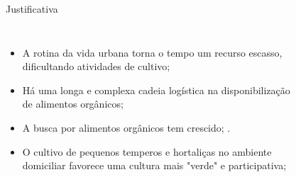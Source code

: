 \begin{frame}[t]{Justificativa} 
    \transdissolve[duration=0.5]
        \begin{columns}[t]
                \begin{itemize}
                    \justifying
                    \item A rotina da vida urbana torna o tempo um recurso escasso, dificultando atividades de cultivo; \cite{G1:3xtransito}
                    \item Há uma longa e complexa cadeia logística na disponibilização de alimentos orgânicos; \cite{silva:cadeiaprodutiva}
                    \item A busca por alimentos orgânicos tem crescido;  \cite{sebrae:organicos}.
                    \item O cultivo de pequenos temperos e hortaliças no ambiente domiciliar favorece uma cultura mais "verde" e participativa; \cite{G1:pequenoagricultor}
                \end{itemize}
            \begin{center}
                \begin{figure}
                    \hspace{125pt}
                \end{figure}
            \end{center}
        \end{columns}
\end{frame}

